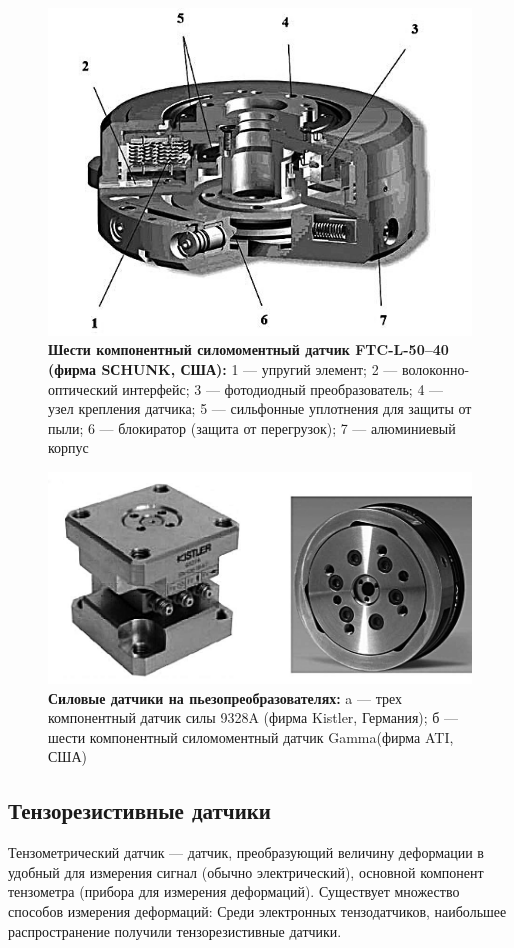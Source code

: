 \documentclass[a4paper,14pt,russian]{extreport} \usepackage{extsizes}
\begin{document}
	\begin{figure}[ht]
		\centering		 
		\includegraphics{./img/img11.jpg}	
		\caption{
			\textbf{ Шести компонентный силомоментный датчик FTC-L-50–40 (фирма
				SСHUNK, США):}						
			1 — упругий элемент; 2 — волоконно-оптический
			интерфейс; 3 — фотодиодный преобразователь; 4 —
			узел крепления датчика; 5 — сильфонные уплотнения
			для защиты от пыли; 6 — блокиратор (защита от перегрузок); 7 — алюминиевый корпус
		}     
		\label{fig_img11}
	\end{figure}
	\begin{figure}[ht]
		\centering		 
		\includegraphics[width=6in]{./img/img12.jpg}	
		\caption{
			\textbf{Силовые датчики на пьезопреобразователях:}			
				a — трех компонентный датчик силы 9328A (фирма Kistler, Германия); б — шести компонентный силомоментный датчик Gamma(фирма ATI, США)
		}     
		\label{fig_img12}
	\end{figure}
	\subsection {Тензорезистивные датчики}
	Тензометрический датчик — датчик, преобразующий величину деформации в удобный для измерения сигнал (обычно электрический), основной компонент тензометра (прибора для измерения деформаций). Существует множество способов измерения деформаций: Среди электронных тензодатчиков, наибольшее распространение получили тензорезистивные датчики.
	
\end{document}
